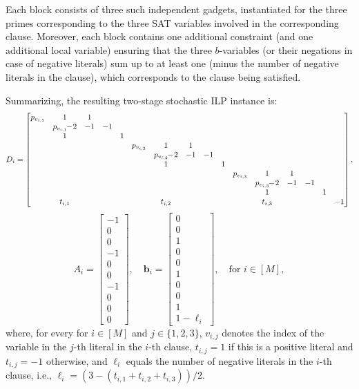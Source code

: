 \documentclass{article}
\newcommand{\tup}[1]{{\mathbf{#1}}}
\newcommand{\bb}{\tup b}
\begin{document}
Each block consists of three such independent gadgets, instantiated for the three primes corresponding to the three SAT variables involved in the corresponding clause. Moreover, each block contains one additional constraint (and one additional local variable) ensuring that the three $b$-variables (or their negations in case of negative literals) sum up to at least one (minus the number of negative literals in the clause), which corresponds to the clause being satisfied.

Summarizing, the resulting two-stage stochastic ILP instance is:
\[\setcounter{MaxMatrixCols}{20}
D_i = \begin{bmatrix}
p_{v_{i,1}} & 1 & 1 & & &   &&&&&   &&&&& \\
& p_{v_{i,1}}\!\!-\!2 & -1 & -1 & & &&&&& &&&&& \\
& 1 & & & 1 & &&&&& \\
&&&&& p_{v_{i,2}} & 1 & 1 & & & &&&&& \\
&&&&& & p_{v_{i,2}}\!\!-\!2 & -1 & -1 & & &&&&& \\
&&&&& & 1 & & & 1 & &&&&& \\
&&&&& &&&&& p_{v_{i,3}} & 1 & 1 & & & \\
&&&&& &&&&& & p_{v_{i,3}}\!\!-\!2 & -1 & -1 & & \\
&&&&& &&&&& & 1 & & & 1 & \\
&t_{i,1}&&&& &t_{i,2}&&&& &t_{i,3}&&&& -1 \\
\end{bmatrix},
\]
\[
A_i = \begin{bmatrix} -1 \\ 0 \\ 0 \\ -1 \\ 0 \\ 0 \\ -1 \\ 0 \\ 0 \\ 0 \end{bmatrix}, \quad
\bb_i = \begin{bmatrix} 0 \\ 0 \\ 1 \\ 0 \\ 0 \\ 1 \\ 0 \\ 0 \\ 1 \\ 1 - \ell_i\end{bmatrix}, \quad
\text{for } i \in [M],
\]
where, for every for $i \in [M]$ and $j \in \{1,2,3\}$, $v_{i,j}$ denotes the index of the variable in the $j$-th literal in the $i$-th clause, $t_{i,j}=1$ if this is a positive literal and $t_{i,j}=-1$ otherwise, and $\ell_i$ equals the number of negative literals in the $i$-th clause, i.e., $\ell_i = (3-(t_{i,1}+t_{i,2}+t_{i,3}))/2$.
\end{document}
